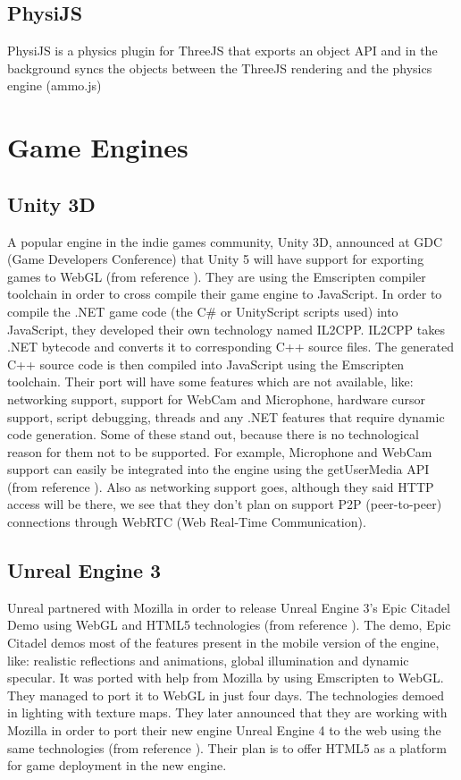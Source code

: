 \subsection{PhysiJS} 

PhysiJS is a physics plugin for ThreeJS that exports an object API and in the background syncs the objects between the ThreeJS rendering and the physics engine (ammo.js)

\section{Game Engines}

\subsection{Unity 3D}

A popular engine in the indie games community, Unity 3D, announced at GDC (Game Developers Conference) that Unity 5 will have support for exporting games to WebGL (from reference \cite{echterhoff14}). They are using the Emscripten compiler toolchain in order to cross compile their game engine to JavaScript. In order to compile the .NET game code (the C\# or UnityScript scripts used) into JavaScript, they developed their own technology named IL2CPP.  
IL2CPP takes .NET bytecode and converts it to corresponding C++ source files. The generated C++ source code is then compiled into JavaScript using the Emscripten toolchain.
Their port will have some features which are not available, like: networking support, support for WebCam and Microphone, hardware cursor support, script debugging, threads and any .NET features that require dynamic code generation.
Some of these stand out, because there is no technological reason for them not to be supported. For example, Microphone and WebCam support can easily be integrated into the engine using the getUserMedia API (from reference \cite{bidelman12}). Also as networking support goes, although they said HTTP access will be there, we see that they don’t plan on support P2P (peer-to-peer) connections through WebRTC (Web Real-Time Communication).

\subsection{Unreal Engine 3}

Unreal partnered with Mozilla in order to release Unreal Engine 3’s Epic Citadel Demo using WebGL and HTML5 technologies (from reference \cite{unrealengine13}). The demo, Epic Citadel demos most of the features present in the mobile version of the engine, like: realistic reflections and animations, global illumination and dynamic specular. It was ported with help from Mozilla by using Emscripten to WebGL. They managed to port it to WebGL in just four days. The technologies demoed in lighting with texture maps. They later announced that they are working with Mozilla in order to port their new engine Unreal Engine 4 to the web using the same technologies (from reference \cite{lardinois14}). Their plan is to offer HTML5 as a platform for game deployment in the new engine.

